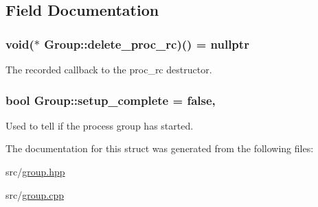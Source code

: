 \subsection{Field Documentation}
\subsubsection[{\texorpdfstring{delete\+\_\+proc\+\_\+rc}{delete_proc_rc}}]{\setlength{\rightskip}{0pt plus 5cm}void($\ast$ Group\+::delete\+\_\+proc\+\_\+rc)() = nullptr\hspace{0.3cm}{\ttfamily [static]}}\hypertarget{struct_group_a737564dd9819ea8050f6f3019c550da2}{}\label{struct_group_a737564dd9819ea8050f6f3019c550da2}


The recorded callback to the proc\+\_\+rc destructor. 

\subsubsection[{\texorpdfstring{setup\+\_\+complete}{setup_complete}}]{\setlength{\rightskip}{0pt plus 5cm}bool Group\+::setup\+\_\+complete = false\hspace{0.3cm}{\ttfamily [static]}, {\ttfamily [private]}}\hypertarget{struct_group_a35632ca452cfe09fbf723539cd264f58}{}\label{struct_group_a35632ca452cfe09fbf723539cd264f58}


Used to tell if the process group has started. 



The documentation for this struct was generated from the following files\+:\begin{DoxyCompactItemize}
\item 
src/\hyperlink{group_8hpp}{group.\+hpp}\item 
src/\hyperlink{group_8cpp}{group.\+cpp}\end{DoxyCompactItemize}
